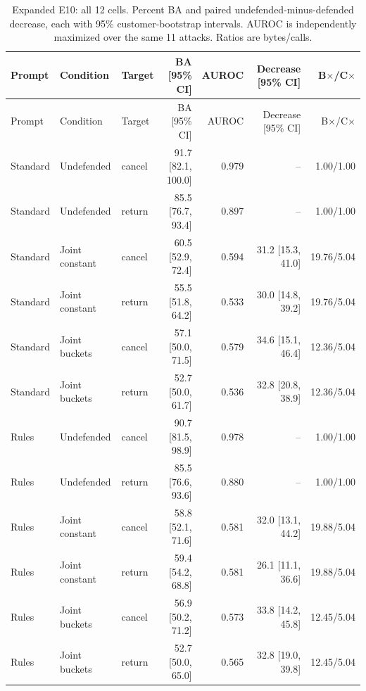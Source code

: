 \begin{longtable}{@{}lllrrrr@{}}
\caption{Expanded E10: all 12 cells. Percent BA and paired undefended-minus-defended decrease, each with 95\% customer-bootstrap intervals. AUROC is independently maximized over the same 11 attacks. Ratios are bytes/calls.}\label{tab:r7-crossfit-all}\\
\toprule Prompt & Condition & Target & BA [95\% CI] & AUROC & Decrease [95\% CI] & B$\times$/C$\times$\\\midrule\endfirsthead
\toprule Prompt & Condition & Target & BA [95\% CI] & AUROC & Decrease [95\% CI] & B$\times$/C$\times$\\\midrule\endhead
Standard & Undefended & cancel & 91.7 [82.1, 100.0] & 0.979 & -- & 1.00/1.00\\
Standard & Undefended & return & 85.5 [76.7, 93.4] & 0.897 & -- & 1.00/1.00\\
Standard & Joint constant & cancel & 60.5 [52.9, 72.4] & 0.594 & 31.2 [15.3, 41.0] & 19.76/5.04\\
Standard & Joint constant & return & 55.5 [51.8, 64.2] & 0.533 & 30.0 [14.8, 39.2] & 19.76/5.04\\
Standard & Joint buckets & cancel & 57.1 [50.0, 71.5] & 0.579 & 34.6 [15.1, 46.4] & 12.36/5.04\\
Standard & Joint buckets & return & 52.7 [50.0, 61.7] & 0.536 & 32.8 [20.8, 38.9] & 12.36/5.04\\
Rules & Undefended & cancel & 90.7 [81.5, 98.9] & 0.978 & -- & 1.00/1.00\\
Rules & Undefended & return & 85.5 [76.6, 93.6] & 0.880 & -- & 1.00/1.00\\
Rules & Joint constant & cancel & 58.8 [52.1, 71.6] & 0.581 & 32.0 [13.1, 44.2] & 19.88/5.04\\
Rules & Joint constant & return & 59.4 [54.2, 68.8] & 0.581 & 26.1 [11.1, 36.6] & 19.88/5.04\\
Rules & Joint buckets & cancel & 56.9 [50.2, 71.2] & 0.573 & 33.8 [14.2, 45.8] & 12.45/5.04\\
Rules & Joint buckets & return & 52.7 [50.0, 65.0] & 0.565 & 32.8 [19.0, 39.8] & 12.45/5.04\\
\bottomrule\end{longtable}
